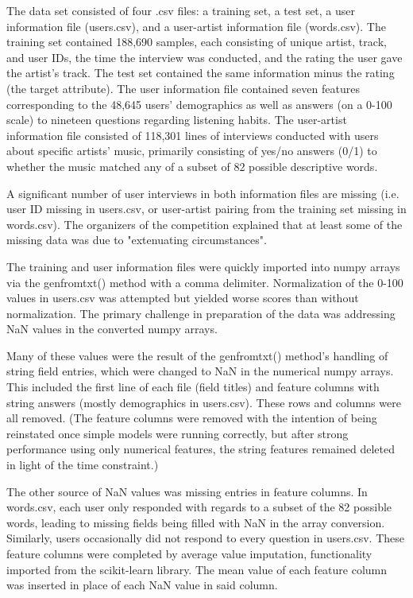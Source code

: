 \documentclass[11pt]{article}
\begin{document}
	The data set consisted of four .csv files: a training set, a test set, a
	user information file (users.csv), and a user-artist information file
	(words.csv). The training
	set contained 188,690 samples, each consisting of unique artist, track,
	and user IDs, the time the interview was conducted, and the rating the user
	gave the artist's track. The test set contained the same information minus
	the rating (the target attribute). The user information file contained
	seven features corresponding to the 48,645 users' demographics as well as
	answers (on a 0-100 scale) to nineteen questions regarding listening habits.
	The user-artist information file consisted of 118,301 lines of interviews conducted
	with users about specific artists' music, primarily consisting of yes/no answers (0/1)
	to whether the music matched any of a subset of 82 possible descriptive words.
	
	A significant number of user interviews in both
	information files are missing (i.e. user ID missing in users.csv, or user-artist
	pairing from the training set missing in words.csv). The organizers of the
	competition explained that at least some of the missing data was due to 
	"extenuating circumstances".
	
	The training and user information files were quickly imported into
	numpy arrays via the genfromtxt() method with a comma delimiter.
	Normalization of the 0-100 values in users.csv was attempted but
	yielded worse scores than without normalization.
	The primary challenge in preparation of the data was addressing NaN
	values in the converted numpy arrays.
	
	Many of these values were the
	result of the genfromtxt() method's handling of string field entries,
	which were changed to NaN in the numerical numpy arrays. This included
	the first line of each file (field titles) and feature columns with
	string answers (mostly demographics in users.csv). These rows and
	columns were all removed. (The feature columns were removed with the
	intention of being reinstated once simple models were running
	correctly, but after strong performance using only numerical features,
	the string features remained deleted in light of the time constraint.)
	
	The other source of NaN values was missing entries in feature columns.
	In words.csv, each user only responded with regards to a subset of the
	82 possible words, leading to missing fields being filled with NaN in
	the array conversion. Similarly, users occasionally did not respond to
	every question in users.csv. These feature columns were completed by
	average value imputation, functionality imported from the scikit-learn
	library. The mean value of each feature column was inserted in place
	of each NaN value in said column.
	
\end{document}

